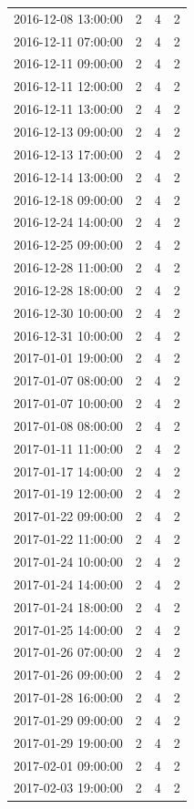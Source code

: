 \begin{tabular}{lrrr}
2016-12-08 13:00:00 & 2 & 4 & 2 \\
2016-12-11 07:00:00 & 2 & 4 & 2 \\
2016-12-11 09:00:00 & 2 & 4 & 2 \\
2016-12-11 12:00:00 & 2 & 4 & 2 \\
2016-12-11 13:00:00 & 2 & 4 & 2 \\
2016-12-13 09:00:00 & 2 & 4 & 2 \\
2016-12-13 17:00:00 & 2 & 4 & 2 \\
2016-12-14 13:00:00 & 2 & 4 & 2 \\
2016-12-18 09:00:00 & 2 & 4 & 2 \\
2016-12-24 14:00:00 & 2 & 4 & 2 \\
2016-12-25 09:00:00 & 2 & 4 & 2 \\
2016-12-28 11:00:00 & 2 & 4 & 2 \\
2016-12-28 18:00:00 & 2 & 4 & 2 \\
2016-12-30 10:00:00 & 2 & 4 & 2 \\
2016-12-31 10:00:00 & 2 & 4 & 2 \\
2017-01-01 19:00:00 & 2 & 4 & 2 \\
2017-01-07 08:00:00 & 2 & 4 & 2 \\
2017-01-07 10:00:00 & 2 & 4 & 2 \\
2017-01-08 08:00:00 & 2 & 4 & 2 \\
2017-01-11 11:00:00 & 2 & 4 & 2 \\
2017-01-17 14:00:00 & 2 & 4 & 2 \\
2017-01-19 12:00:00 & 2 & 4 & 2 \\
2017-01-22 09:00:00 & 2 & 4 & 2 \\
2017-01-22 11:00:00 & 2 & 4 & 2 \\
2017-01-24 10:00:00 & 2 & 4 & 2 \\
2017-01-24 14:00:00 & 2 & 4 & 2 \\
2017-01-24 18:00:00 & 2 & 4 & 2 \\
2017-01-25 14:00:00 & 2 & 4 & 2 \\
2017-01-26 07:00:00 & 2 & 4 & 2 \\
2017-01-26 09:00:00 & 2 & 4 & 2 \\
2017-01-28 16:00:00 & 2 & 4 & 2 \\
2017-01-29 09:00:00 & 2 & 4 & 2 \\
2017-01-29 19:00:00 & 2 & 4 & 2 \\
2017-02-01 09:00:00 & 2 & 4 & 2 \\
2017-02-03 19:00:00 & 2 & 4 & 2 \\

\end{tabular}
